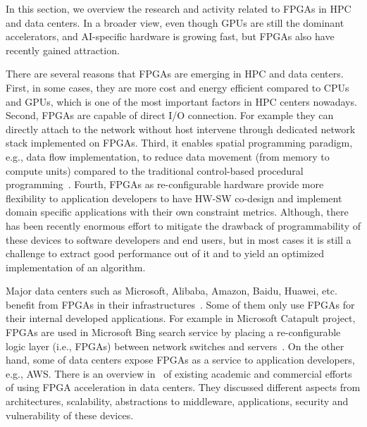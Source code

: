 
\iffalse

In this section, we overview the research and activity related to FPGAs in HPC and data centers. In a broader view, even though GPUs are still the dominant accelerators, and AI-specific hardware is growing fast, but FPGAs also have recently gained attraction.

There are several reasons that FPGAs are emerging in HPC and data centers. First, in some cases, they are more cost and energy efficient compared to CPUs and GPUs, which is one of the most important factors in HPC centers nowadays.
Second, FPGAs are capable of direct I/O connection. For example they can directly attach to the network without host intervene through dedicated network stack implemented on FPGAs. 
Third, it enables spatial programming paradigm, e.g., data flow implementation, to reduce data movement (from memory to compute units) compared to the traditional control-based procedural programming~\cite{Licht2022PythonDesign}. 
Fourth, FPGAs as re-configurable hardware provide more flexibility to application developers to have HW-SW co-design and implement domain specific applications with their own constraint metrics. Although, there has been recently enormous effort to mitigate the drawback of programmability of these devices to software developers and end users, but in most cases it is still a challenge to extract good performance out of it and to yield an optimized implementation of an algorithm.

Major data centers such as Microsoft, Alibaba, Amazon, Baidu, Huawei, etc. benefit from FPGAs in their infrastructures~\cite{firestone2018azure,PutnamAServices,caulfield2016cloud,ernst2020competing,xilinx_alibaba}. Some of them only use FPGAs for their internal developed applications. For example in Microsoft Catapult project, FPGAs are used in Microsoft Bing search service by placing a re-configurable logic layer (i.e., FPGAs) between network switches and servers~\cite{PutnamAServices,caulfield2016cloud}. 
On the other hand, some of data centers expose FPGAs as a service to application developers, e.g., AWS. There is an overview in~\cite{Bobda2022TheCloud} of existing academic and commercial efforts of using FPGA acceleration in data centers. They discussed different aspects from architectures, scalability, abstractions to middleware, applications, security and vulnerability of these devices. 

